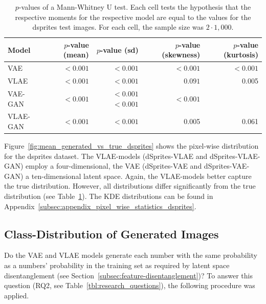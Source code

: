 \begin{table}
    \begin{tabular}{lrrrr}
        \toprule
        Model              & $p$-value (mean) & $p$-value (sd) & $p$-value (skewness) & $p$-value (kurtosis) \\
        \midrule
        \ac{VAE}           & $< 0.001$        & $< 0.001$      & $< 0.001$            & $< 0.001$            \\
        \ac{VLAE}          & $< 0.001$        & $< 0.001$      & $0.091$              & 0.005                \\
        \ac{VAE}-\ac{GAN} & $< 0.001$ & $< 0.001$            $< 0.001$ & $< 0.001$ \\
        \ac{VLAE}-\ac{GAN} & $< 0.001$        & $< 0.001$      & 0.005                & 0.061                \\
        \bottomrule
    \end{tabular}
    \caption[Models on dSprites - $p$-values for Distributions]{$p$-values of a Mann-Whitney U test. Each cell tests the hypothesis that the respective moments for the respective model are equal to the values for the dsprites test images. For each cell, the sample size was $2\cdot 1,000$.}
    \label{tab:vae-vlae-dsprites}
\end{table}

Figure~\ref{fig:mean_generated_vs_true_dsprites} shows the pixel-wise distribution for the dsprites dataset.
The \ac{VLAE}-models (dSprites-\ac{VLAE} and dSprites-\ac{VLAE}-\ac{GAN}) employ a four-dimensional, the \ac{VAE} (dSprites-\ac{VAE} and dSprites-\ac{VAE}-\ac{GAN}) a ten-dimensional latent space.
Again, the \ac{VLAE}-models better capture the true distribution.
However, all distributions differ significantly from the true distribution (see Table~\ref{tab:vae-vlae-dsprites}).
The \ac{KDE} distributions can be found in Appendix~\ref{subsec:appendix_pixel_wise_statistics_dsprites}.

\subsection{Class-Distribution of Generated Images}\label{subsec:class-distribution-of-generated-images}

Do the \ac{VAE} and \ac{VLAE} models generate each number with the same probability as a numbers' probability in the training set as required by latent space disentanglement (see Section~\ref{subsec:feature-disentanglement})?
To answer this question (RQ2, see Table~\ref{tbl:research_questions}), the following procedure was applied.

